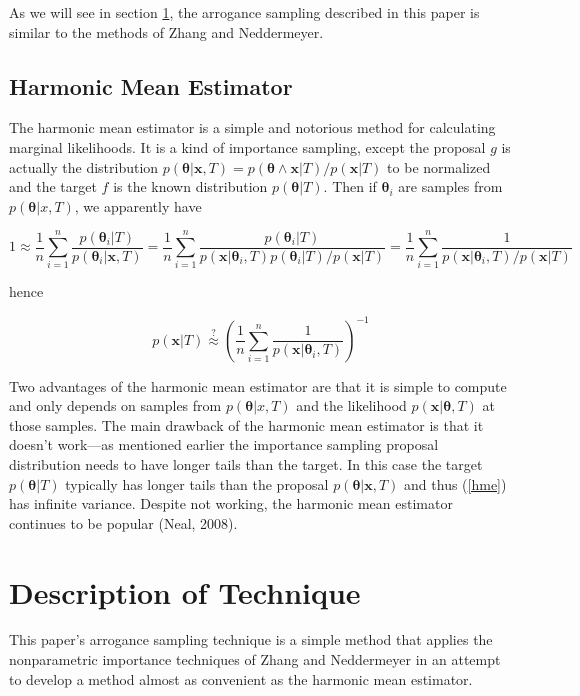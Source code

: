 \documentclass[letterpaper,12pt]{article}
\newcommand{\bx}{\boldsymbol x}
\newcommand{\btheta}{\boldsymbol \theta}
\begin{document}
As we will see in section \ref{my technique}, the arrogance sampling
described in this paper is similar to the methods of Zhang and
Neddermeyer.

\subsection{Harmonic Mean Estimator}

The harmonic mean estimator is a simple and notorious method for
calculating marginal likelihoods.  It is a kind of importance
sampling, except the proposal $g$ is actually the distribution
$p(\btheta|\bx, T) = p(\btheta \wedge \bx|T) / p(\bx|T)$ to be
normalized and the target $f$ is the known distribution
$p(\btheta|T)$.  Then if $\btheta_i$ are samples from
$p(\btheta|x,T)$, we apparently have

\begin{equation*}
  1 \approx \frac{1}{n} \sum_{i=1}^{n}
  \frac{p(\btheta_i|T)}{p(\btheta_i|\bx, T)} = \frac{1}{n} \sum_{i=1}^{n}
  \frac{p(\btheta_i|T)}{p(\bx|\btheta_i, T)p(\btheta_i|T) /
    p(\bx|T)}
  = \frac{1}{n} \sum_{i=1}^{n} \frac{1}{p(\bx|\btheta_i, T) / p(\bx|T)}
\end{equation*}

\noindent hence

\begin{equation} \label{hme}
  p(\bx|T) \stackrel{?}{\approx} \left(\frac{1}{n} \sum_{i=1}^{n}
  \frac{1}{p(\bx|\btheta_i, T)} \right)^{-1}
\end{equation}

Two advantages of the harmonic mean estimator are that it is simple to
compute and only depends on samples from $p(\btheta|x, T)$ and the
likelihood $p(\bx|\btheta,T)$ at those samples.  The main drawback of
the harmonic mean estimator is that it doesn't work---as mentioned
earlier the importance sampling proposal distribution needs to have
longer tails than the target.  In this case the target $p(\btheta|T)$
typically has longer tails than the proposal $p(\btheta|\bx, T)$ and
thus (\ref{hme}) has infinite variance.  Despite not working, the
harmonic mean estimator continues to be popular (Neal, 2008).


\section{Description of Technique}
\label{my technique}

This paper's arrogance sampling technique is a simple method that
applies the nonparametric importance techniques of Zhang and
Neddermeyer in an attempt to develop a method almost as convenient as
the harmonic mean estimator.
\end{document}
